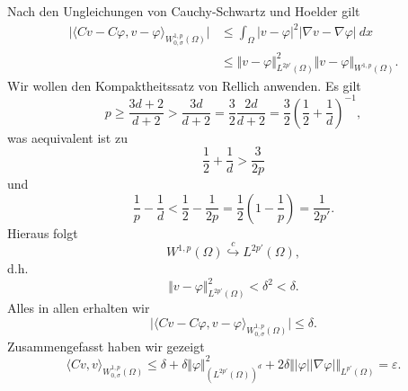 \documentclass{article}
\begin{document}
Nach den Ungleichungen von Cauchy-Schwartz und Hoelder gilt
\begin{equation*}
  \begin{aligned}
    \vert \langle  Cv - C \varphi, v - \varphi \rangle_{W_{0, \sigma}^{1,p} (\Omega)} \vert
    &\leq \int_{\Omega}^{} \vert v - \varphi \vert^2 \vert \nabla v - \nabla \varphi \vert \ dx \\
    &\leq \Vert v - \varphi \Vert_{L^{2 p'}(\Omega)}^2 \Vert v - \varphi \Vert_{W^{1,p}(\Omega)}.
  \end{aligned}
  \end{equation*}
Wir wollen den Kompaktheitssatz von Rellich anwenden. Es gilt
\begin{equation*}
  p
  \geq \frac{3d + 2}{d+2}
  > \frac{3d}{d+2}
  = \frac{3}{2} \frac{2d}{d+2}
  = \frac{3}{2} \left(\frac{1}{2} + \frac{1}{d}\right)^{-1},
\end{equation*}
was aequivalent ist zu
\begin{equation*}
  \frac{1}{2} + \frac{1}{d}
  > \frac{3}{2p}
\end{equation*}
und
\begin{equation*}
  \frac{1}{p}
  - \frac{1}{d}
  <
  \frac{1}{2}
  - \frac{1}{2p}
  = \frac{1}{2} \left( 1 - \frac{1}{p}\right)
  = \frac{1}{2p'}.
\end{equation*}
Hieraus folgt
\begin{equation*}
  W^{1,p}(\Omega) 
  \stackrel{c}{\hookrightarrow}
  L^{2p'}(\Omega),
\end{equation*}
d.h.\
\begin{equation*}
  \Vert v - \varphi \Vert_{L^{2 p'}(\Omega)}^2
  < \delta^2
  < \delta.
\end{equation*}
Alles in allen erhalten wir
\begin{equation*}
  \vert \langle  Cv - C \varphi, v - \varphi \rangle_{W_{0, \sigma}^{1,p} (\Omega)} \vert
  \leq \delta.
\end{equation*}
Zusammengefasst haben wir gezeigt
\begin{equation*}
  \langle Cv, v \rangle_{W_{0, \sigma}^{1,p} (\Omega)}
  \leq \delta
  + \delta \Vert \varphi \Vert_{(L^{2 p'}(\Omega))^d}^2 
  + 2 \delta \Vert \vert \varphi \vert \vert \nabla \varphi \vert \Vert_{L^{p'}(\Omega)}
  = \varepsilon.
\end{equation*}
\end{document}
